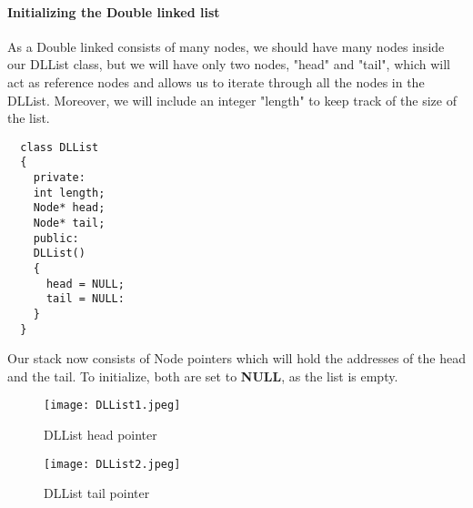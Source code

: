 \documentclass[11pt,fleqn]{book} %
\begin{document}
\paragraph{Initializing the Double linked list}
As a Double linked consists of many nodes, we should have many nodes inside our DLList class, but we will have only two nodes, "head" and "tail", which will act as reference nodes and allows us to iterate through all the nodes in the DLList. Moreover, we will include an integer "length" to keep track of the size of the list.
\begin{lstlisting}
  class DLList
  {
    private:
    int length;
    Node* head;
    Node* tail;
    public:
    DLList()
    {
      head = NULL;
      tail = NULL:
    }
  }
\end{lstlisting}
Our stack now consists of Node pointers which will hold the addresses of the head and the tail. To initialize, both are set to \textbf{NULL}, as the list is empty.
\begin{figure}[H]
  \centering
  \texttt{[image: DLList1.jpeg]}
  \caption{DLList head pointer}
\end{figure}
\begin{figure}[H]
  \centering
  \texttt{[image: DLList2.jpeg]}
  \caption{DLList tail pointer}
\end{figure}
\end{document}
